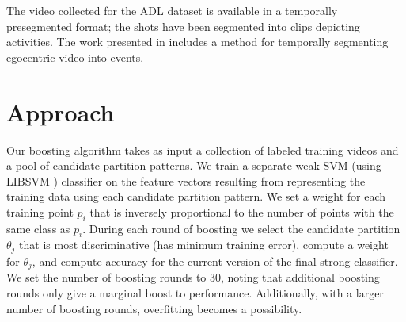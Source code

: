 \documentclass[10pt,twocolumn,letterpaper]{article}
\begin{document}
	The video collected for the ADL dataset is available in a temporally
	presegmented format; the shots have been segmented into clips depicting
	activities. The work presented in \cite{Lee12} includes a method for
	temporally segmenting egocentric video into events.


\section{Approach}

	Our boosting algorithm takes as input a collection of labeled training videos
	and a pool of candidate partition patterns. We train a separate weak SVM 
  (using LIBSVM \cite{Chang11})
	classifier on the feature vectors resulting from representing the training
	data using each candidate partition pattern. We set a weight for each
	training point $p_i$ that is inversely proportional to the number of points
	with the same class as $p_i$. During each round of boosting we select the
	candidate partition $\theta_j$ that is most discriminative (has minimum training
	error), compute a weight for $\theta_j$, and compute accuracy for the
	current version of the final strong classifier. 
	We set the number of boosting rounds to 30, noting that additional boosting
	rounds only give a marginal boost to performance. Additionally, with a
	larger number of boosting rounds, overfitting becomes a possibility.\\

	
\end{document}
